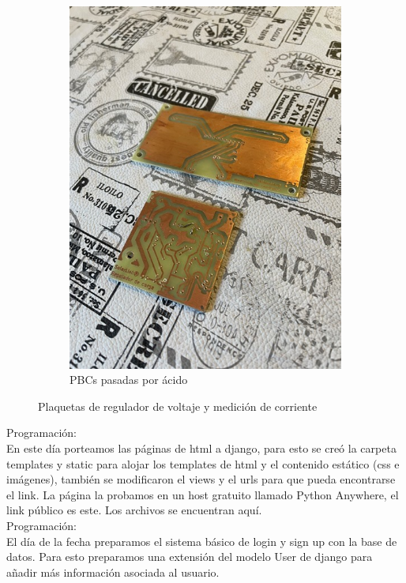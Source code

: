 \begin{figure}[H]
\begin{subfigure}{0.5\textwidth}
\includegraphics[width=0.9\linewidth]{informes/IMG_8054.jpg}
\caption{PBCs pasadas por ácido}
\end{subfigure}

\caption{Plaquetas de regulador de voltaje y medición de corriente}
\label{fig:image2}
\end{figure}

Programación:\\

En este día porteamos las páginas de html a django, para esto se creó la carpeta templates y static para alojar los templates de html y el contenido estático (css e imágenes), también se modificaron el views y el urls para que pueda encontrarse el link. La página la probamos en un host gratuito llamado Python Anywhere, el link público es este. Los archivos se encuentran aquí.\\

Programación:\\

El día de la fecha preparamos el sistema básico de login y sign up con la base de datos. Para esto preparamos una extensión del modelo User de django para añadir más información asociada al usuario.\\


